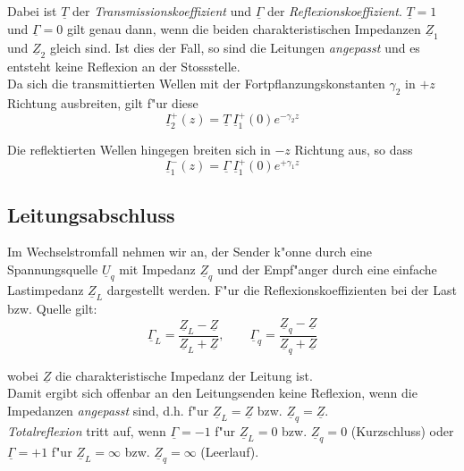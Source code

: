 \documentclass[german, 10pt, a4paper, headsepline]{scrreprt}
\theoremstyle{remark}
\begin{document}
Dabei ist $\underline{T}$ der \textit{Transmissionskoeffizient} und $\underline{\Gamma}$ der \textit{Reflexionskoeffizient}. $\underline{T}= 1$ und $\underline{\Gamma} = 0$ gilt genau dann, wenn die beiden charakteristischen Impedanzen $\underline{Z}_1$ und $\underline{Z}_2$ gleich sind. Ist dies der Fall, so sind die Leitungen \textit{angepasst} und es entsteht keine Reflexion an der Stossstelle.\\

Da sich die transmittierten Wellen mit der Fortpflanzungskonstanten $\gamma_2$ in $+z$ Richtung ausbreiten, gilt f"ur diese
\begin{displaymath}
	\underline{I}_2^+(z) = \underline{T}\:\underline{I}_1^+(0)e^{-\gamma_2 z}
\end{displaymath}

Die reflektierten Wellen hingegen breiten sich in $-z$ Richtung aus, so dass
\begin{displaymath}
	\underline{I}_1^-(z) = \underline{\Gamma}\:\underline{I}_1^+(0)e^{+\gamma_1 z}
\end{displaymath}

\subsection{Leitungsabschluss}

Im Wechselstromfall nehmen wir an, der Sender k"onne durch eine Spannungsquelle $\underline{U}_q$ mit Impedanz $\underline{Z}_q$ und der Empf"anger durch eine einfache Lastimpedanz $\underline{Z}_L$ dargestellt werden. F"ur die Reflexionskoeffizienten bei der Last bzw. Quelle gilt:
\begin{displaymath}
	\underline{\Gamma}_L = \frac{\underline{Z}_L - \underline{Z}}{\underline{Z}_L + \underline{Z}}, \qquad \underline{\Gamma}_q = \frac{\underline{Z}_q - \underline{Z}}{\underline{Z}_q + \underline{Z}}
\end{displaymath}

wobei $\underline{Z}$ die charakteristische Impedanz der Leitung ist.\\

Damit ergibt sich offenbar an den Leitungsenden keine Reflexion, wenn die Impedanzen \textit{angepasst} sind, d.h. f"ur $\underline{Z}_L = \underline{Z}$ bzw. $\underline{Z}_q = \underline{Z}$.\\

\textit{Totalreflexion} tritt auf, wenn $\underline{\Gamma} = -1$ f"ur $\underline{Z}_L = 0$ bzw. $\underline{Z}_q = 0$ (Kurzschluss) oder $\underline{\Gamma} = +1$ f"ur $\underline{Z}_L = \infty$ bzw. $\underline{Z}_q = \infty$ (Leerlauf).\\
\end{document}
